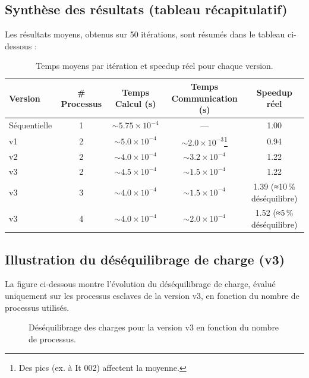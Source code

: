 \documentclass[a4paper,13pt]{book}
\begin{document}
\subsection{Synthèse des résultats (tableau récapitulatif)}
Les résultats moyens, obtenus sur 50 itérations, sont résumés dans le tableau ci-dessous :

\begin{table}[ht]
\centering
\caption{Temps moyens par itération et speedup réel pour chaque version.}
\label{tab:temps}
\begin{tabular}{lcccc}
\toprule
\textbf{Version} & \textbf{\# Processus} & \textbf{Temps Calcul (s)} & \textbf{Temps Communication (s)} & \textbf{Speedup réel} \\
\midrule
Séquentielle  & 1   & $\sim5.75\times10^{-4}$  & ---           & 1.00  \\
v1            & 2   & $\sim5.0\times10^{-4}$   & $\sim2.0\times10^{-3}$\footnote{Des pics (ex. à It 002) affectent la moyenne.}  & 0.94  \\
v2            & 2   & $\sim4.0\times10^{-4}$   & $\sim3.2\times10^{-4}$ & 1.22  \\
v3            & 2   & $\sim4.5\times10^{-4}$   & $\sim1.5\times10^{-4}$ & 1.22  \\
v3            & 3   & $\sim4.0\times10^{-4}$   & $\sim1.5\times10^{-4}$ & 1.39 \quad (≈10\,\% déséquilibre) \\
v3            & 4   & $\sim4.0\times10^{-4}$   & $\sim2.0\times10^{-4}$ & 1.52 \quad (≈5\,\% déséquilibre) \\
\bottomrule
\end{tabular}
\end{table}

\subsection{Illustration du déséquilibrage de charge (v3)}
La figure ci-dessous montre l’évolution du déséquilibrage de charge, évalué uniquement sur les processus esclaves de la version v3, en fonction du nombre de processus utilisés.

\begin{figure}[ht]
  \centering
  \caption{Déséquilibrage des charges pour la version v3 en fonction du nombre de processus.}
  \label{fig:load_balance}
\end{figure}
\end{document}
